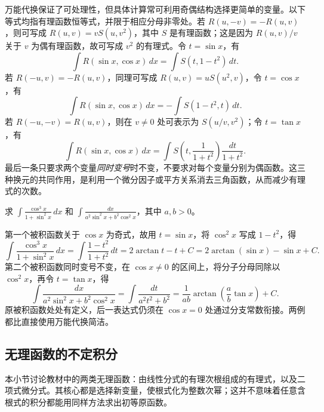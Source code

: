 万能代换保证了可处理性，但具体计算常可利用奇偶结构选择更简单的变量。以下等式均指有理函数恒等式，并限于相应分母非零处。若 $R(u,-v)=-R(u,v)$，则可写成 $R(u,v)=vS(u,v^2)$，其中 $S$ 是有理函数；这是因为 $R(u,v)/v$ 关于 $v$ 为偶有理函数，故可写成 $v^2$ 的有理式。令 $t=\sin x$，有
\[
    \int R(\sin x,\cos x)\,dx
       =\int S(t,1-t^2)\,dt.
\]
若 $R(-u,v)=-R(u,v)$，同理可写成 $R(u,v)=uS(u^2,v)$，令 $t=\cos x$，有
\[
    \int R(\sin x,\cos x)\,dx
       =-\int S(1-t^2,t)\,dt.
\]
若 $R(-u,-v)=R(u,v)$，则在 $v\neq0$ 处可表示为 $S(u/v,v^2)$；令 $t=\tan x$，有
\[
    \int R(\sin x,\cos x)\,dx
       =\int S\left(t,\frac1{1+t^2}\right)\frac{dt}{1+t^2}.
\]
最后一条只要求两个变量\emph{同时变号}时不变，不要求对每个变量分别为偶函数。这三种换元的共同作用，是利用一个微分因子或平方关系消去三角函数，从而减少有理式的次数。

\begin{example}
\label{ex:parity-substitutions-for-trigonometric-integrals}
求 $\displaystyle\int\frac{\cos^3x}{1+\sin^2x}\,dx$ 和 $\displaystyle\int\frac{dx}{a^2\sin^2x+b^2\cos^2x}$，其中 $a,b>0$。
\end{example}

\begin{solve}
第一个被积函数关于 $\cos x$ 为奇式，故用 $t=\sin x$，将 $\cos^2x$ 写成 $1-t^2$，得
\[
    \int\frac{\cos^3x}{1+\sin^2x}\,dx
      =\int\frac{1-t^2}{1+t^2}\,dt
      =2\arctan t-t+C
      =2\arctan(\sin x)-\sin x+C.
\]
第二个被积函数同时变号不变，在 $\cos x\neq0$ 的区间上，将分子分母同除以 $\cos^2x$，再令 $t=\tan x$，得
\[
    \int\frac{dx}{a^2\sin^2x+b^2\cos^2x}
       =\int\frac{dt}{a^2t^2+b^2}
       =\frac1{ab}\arctan\left(\frac ab\tan x\right)+C.
\]
原被积函数处处有定义，后一表达式仍须在 $\cos x=0$ 处通过分支常数衔接。两例都比直接使用万能代换简洁。
\end{solve}

\subsection{无理函数的不定积分}
\label{subsec:integrals-of-irrational-functions}

本小节讨论教材中的两类无理函数：由线性分式的有理次根组成的有理式，以及二项式微分式。其核心都是选择新变量，使根式化为整数次幂；这并不意味着任意含根式的积分都能用同样方法求出初等原函数。

